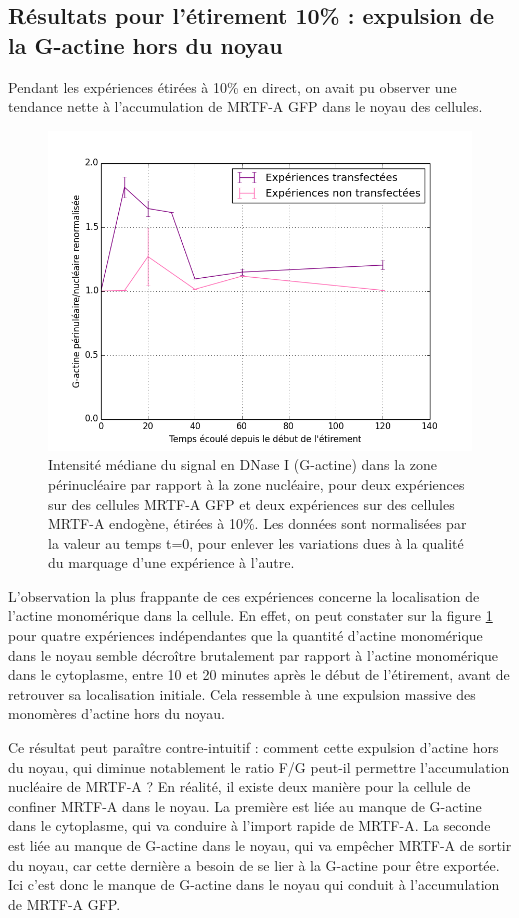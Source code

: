 \subsection{Résultats pour l'étirement 10\% : expulsion de la G-actine hors du noyau}

Pendant les expériences étirées à 10\% en direct, on avait pu observer une tendance nette à l'accumulation de MRTF-A GFP dans le noyau des cellules. 

\begin{figure}
\includegraphics[scale=0.5]{Figures/Et10_G_ratio.png} 
\caption{\label{Et10_G} Intensité médiane du signal en DNase I (G-actine) dans la zone périnucléaire par rapport à la zone nucléaire, pour deux expériences sur des cellules MRTF-A GFP et deux expériences sur des cellules MRTF-A endogène, étirées à 10\%. Les données sont normalisées par la valeur au temps t=0, pour enlever les variations dues à la qualité du marquage d'une expérience à l'autre.}
\end{figure}

L'observation la plus frappante de ces expériences concerne la localisation de l'actine monomérique dans la cellule. En effet, on peut constater sur la figure \ref{Et10_G} pour quatre expériences indépendantes que la quantité d'actine monomérique dans le noyau semble décroître brutalement par rapport à l'actine monomérique dans le cytoplasme, entre 10 et 20 minutes après le début de l'étirement, avant de retrouver sa localisation initiale. Cela ressemble à une expulsion massive des monomères d'actine hors du noyau. 

Ce résultat peut paraître contre-intuitif : comment cette expulsion d'actine hors du noyau, qui diminue notablement le ratio F/G peut-il permettre l'accumulation nucléaire de MRTF-A ? En réalité, il existe deux manière pour la cellule de confiner MRTF-A dans le noyau. La première est liée au manque de G-actine dans le cytoplasme, qui va conduire à l'import rapide de MRTF-A. La seconde est liée au manque de G-actine dans le noyau, qui va empêcher MRTF-A de sortir du noyau, car cette dernière a besoin de se lier à la G-actine pour être exportée. Ici c'est donc le manque de G-actine dans le noyau qui conduit à l'accumulation de MRTF-A GFP. 

